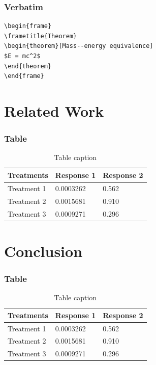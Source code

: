 \documentclass{beamer}
\begin{document}

\begin{frame}[fragile] %
\frametitle{Verbatim}
\begin{example}
\begin{verbatim}
\begin{frame}
\frametitle{Theorem}
\begin{theorem}[Mass--energy equivalence]
$E = mc^2$
\end{theorem}
\end{frame}\end{verbatim}
\end{example}
\end{frame}

\section{Related Work}

\begin{frame}
\frametitle{Table}
\begin{table}
\begin{tabular}{l l l}
\toprule
\textbf{Treatments} & \textbf{Response 1} & \textbf{Response 2}\\
\midrule
Treatment 1 & 0.0003262 & 0.562 \\
Treatment 2 & 0.0015681 & 0.910 \\
Treatment 3 & 0.0009271 & 0.296 \\
\bottomrule
\end{tabular}
\caption{Table caption}
\end{table}
\end{frame}

\section{Conclusion}

\begin{frame}
\frametitle{Table}
\begin{table}
\begin{tabular}{l l l}
\toprule
\textbf{Treatments} & \textbf{Response 1} & \textbf{Response 2}\\
\midrule
Treatment 1 & 0.0003262 & 0.562 \\
Treatment 2 & 0.0015681 & 0.910 \\
Treatment 3 & 0.0009271 & 0.296 \\
\bottomrule
\end{tabular}
\caption{Table caption}
\end{table}
\end{frame}
\end{document}
